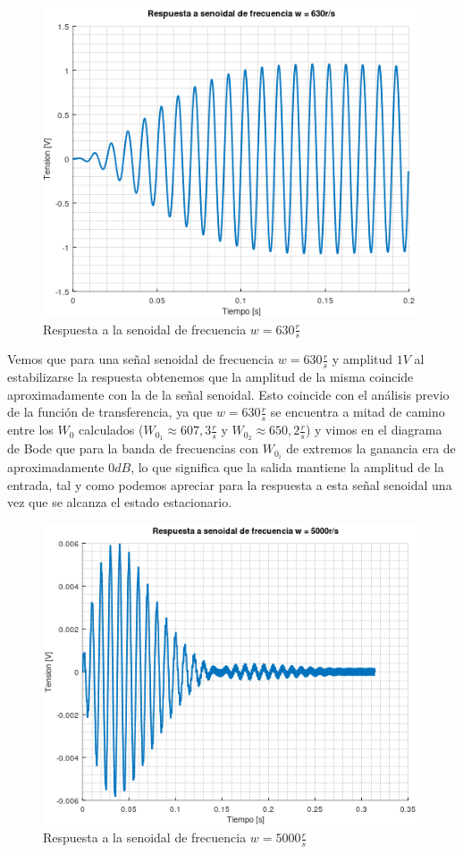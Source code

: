 \documentclass[11pt,a4paper]{report}
\begin{document}
\newpage
\begin{figure}[h!]
\includegraphics[scale=1]{RtaSenoidalMedio.png}
\caption{Respuesta a la senoidal de frecuencia $w = 630\frac{r}{s}$}
\end{figure}

Vemos que para una señal senoidal de frecuencia $w = 630\frac{r}{s}$ y amplitud
$1V$ al estabilizarse la respuesta obtenemos que la amplitud de la misma coincide aproximadamente con la de la señal senoidal. Esto coincide con el análisis
previo de la función de transferencia, ya que $w = 630\frac{r}{s}$ se encuentra a mitad de camino entre los $W_{0}$ calculados ($W_{0_{1}} \approx 607,3 \frac{r}{s}$ y 
$W_{0_{2}} \approx 650,2 \frac{r}{s}$) y vimos en el diagrama de Bode que para la banda de frecuencias con $W_{0_{i}}$ de extremos la ganancia era de aproximadamente $0dB$, lo que significa que la salida mantiene la amplitud de la entrada, tal y como podemos apreciar para la respuesta a esta señal senoidal una vez que se alcanza el estado estacionario.

\newpage
\begin{figure}[h!]
\includegraphics[scale=0.98]{RtaSenoidalAlto.png}
\caption{Respuesta a la senoidal de frecuencia $w = 5000\frac{r}{s}$}
\end{figure}
\end{document}
